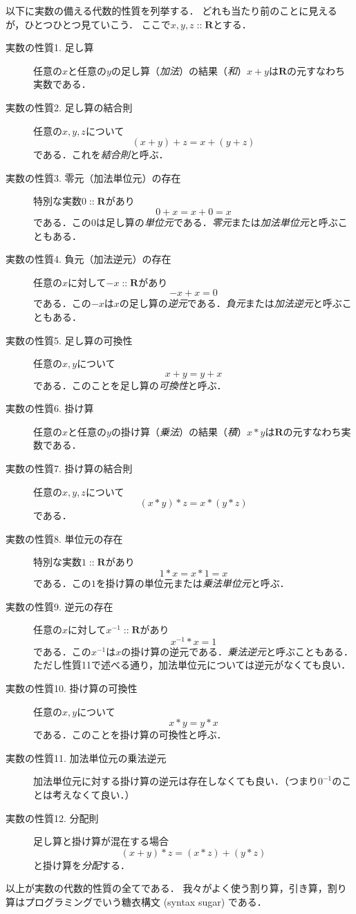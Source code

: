 \documentclass[twocolumn]{jsbook}
\newcommand{\keyword}[1]{\emph{#1}}
\DeclareMathOperator{\mathIn}{::}
\newcommand{\mathSet}[1]{\mathbf{#1}}
\begin{document}
以下に実数の備える代数的性質を列挙する．
どれも当たり前のことに見えるが，ひとつひとつ見ていこう．
ここで$x,y,z\mathIn\mathSet{R}$とする．
\begin{description}
\item[実数の性質1. 足し算] 任意の$x$と任意の$y$の足し算（\keyword{加法}）の結果（\keyword{和}）$x+y$は$\mathSet{R}$の元すなわち実数である．
\item[実数の性質2. 足し算の結合則] 任意の$x,y,z$について$$(x+y)+z=x+(y+z)$$である．これを\keyword{結合則}と呼ぶ．
\item[実数の性質3. 零元（加法単位元）の存在] 特別な実数$0\mathIn\mathSet{R}$があり$$0+x=x+0=x$$である．この$0$は足し算の\keyword{単位元}である．\keyword{零元}または\keyword{加法単位元}と呼ぶこともある．
\item[実数の性質4. 負元（加法逆元）の存在] 任意の$x$に対して$-x\mathIn\mathSet{R}$があり$$-x+x=0$$である．この$-x$は$x$の足し算の\keyword{逆元}である．\keyword{負元}または\keyword{加法逆元}と呼ぶこともある．
\item[実数の性質5. 足し算の可換性] 任意の$x,y$について$$x+y=y+x$$である．このことを足し算の\keyword{可換性}と呼ぶ．
\item[実数の性質6. 掛け算] 任意の$x$と任意の$y$の掛け算（\keyword{乗法}）の結果（\keyword{積}）$x*y$は$\mathSet{R}$の元すなわち実数である．
\item[実数の性質7. 掛け算の結合則] 任意の$x,y,z$について$$(x*y)*z=x*(y*z)$$である．
\item[実数の性質8. 単位元の存在] 特別な実数$1\mathIn\mathSet{R}$があり$$1*x=x*1=x$$である．この$1$を掛け算の単位元または\keyword{乗法単位元}と呼ぶ．
\item[実数の性質9. 逆元の存在] 任意の$x$に対して$x^{-1}\mathIn\mathSet{R}$があり$$x^{-1}*x=1$$である．この$x^{-1}$は$x$の掛け算の逆元である．\keyword{乗法逆元}と呼ぶこともある．ただし性質11で述べる通り，加法単位元については逆元がなくても良い．
\item[実数の性質10. 掛け算の可換性] 任意の$x,y$について$$x*y=y*x$$である．このことを掛け算の可換性と呼ぶ．
\item[実数の性質11. 加法単位元の乗法逆元] 加法単位元に対する掛け算の逆元は存在しなくても良い．（つまり$0^{-1}$のことは考えなくて良い．）
\item[実数の性質12. 分配則] 足し算と掛け算が混在する場合$$(x+y)*z=(x*z)+(y*z)$$と掛け算を\keyword{分配}する．
\end{description}
以上が実数の代数的性質の全てである．
我々がよく使う割り算，引き算，割り算はプログラミングでいう糖衣構文 (syntax sugar) である．
\end{document}
